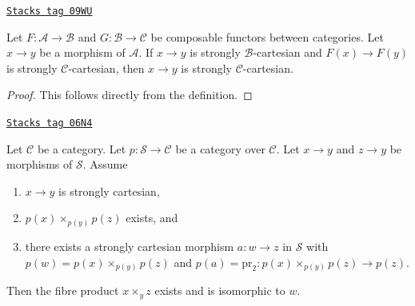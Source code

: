 \begin{lemma}
\label{categories-lemma-cartesian-over-cartesian}
\href{https://stacks.math.columbia.edu/tag/09WU}{\texttt{Stacks tag 09WU}}

Let $F : \mathcal{A} \to \mathcal{B}$ and $G : \mathcal{B} \to \mathcal{C}$
be composable functors between categories. Let $x \to y$ be a morphism of
$\mathcal{A}$. If $x \to y$ is strongly $\mathcal{B}$-cartesian
and $F(x) \to F(y)$ is strongly $\mathcal{C}$-cartesian, then
$x \to y$ is strongly $\mathcal{C}$-cartesian.
\end{lemma}

\begin{proof}
This follows directly from the definition.
\end{proof}

\begin{lemma}
\label{categories-lemma-strongly-cartesian-fibre-product}
\href{https://stacks.math.columbia.edu/tag/06N4}{\texttt{Stacks tag 06N4}}

Let $\mathcal{C}$ be a category.
Let $p : \mathcal{S} \to \mathcal{C}$ be a category over $\mathcal{C}$.
Let $x \to y$ and $z \to y$ be morphisms of $\mathcal{S}$.
Assume
\begin{enumerate}
\item $x \to y$ is strongly cartesian,
\item $p(x) \times_{p(y)} p(z)$ exists, and
\item there exists a strongly cartesian morphism $a : w \to z$ in
$\mathcal{S}$ with $p(w) = p(x) \times_{p(y)} p(z)$ and
$p(a) = \text{pr}_2 : p(x) \times_{p(y)} p(z) \to p(z)$.
\end{enumerate}
Then the fibre product $x \times_y z$ exists and is isomorphic to $w$.
\end{lemma}

